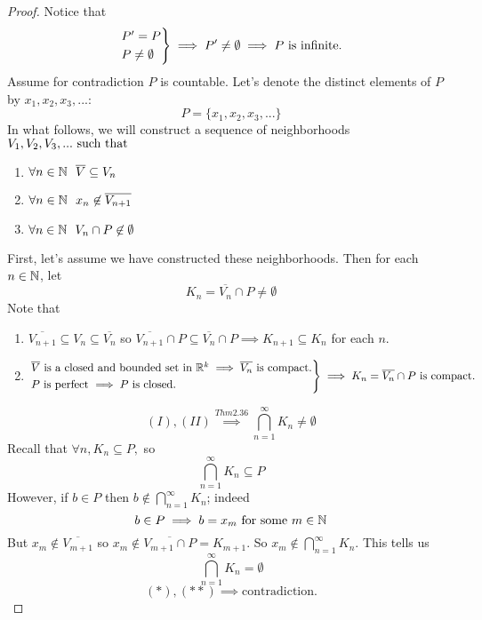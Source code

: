 \begin{proof}
    Notice that
    $$
    \begin{rcases*}
        P' = P \\
        P \not = \emptyset
    \end{rcases*}
    \implies P' \not = \emptyset \implies P \text{ is infinite.}
    $$
    Assume for contradiction $P$ is countable. Let's denote the distinct elements of $P$ by $x_1, x_2, x_3,... :$
    $$P=\{x_1, x_2, x_3,...\}$$
    In what follows, we will construct a sequence of neighborhoods $V_1, V_2, V_3,... \text{ such that }$
    \begin{enumerate}[$(i)$]
        \item $\forall n \in \mathbb{N} ~~\overline{V} \subseteq V_n$
        \item $\forall n \in \mathbb{N} ~~x_n \not \in \overline{V_{n+1}}$
        \item $\forall n \in \mathbb{N} ~~V_n \cap P \not \in \emptyset$
    \end{enumerate}
    First, let's assume we have constructed these neighborhoods.
    Then for each $n\in\mathbb{N}$, let
    $$K_n = \overline{V_n} \cap P \not = \emptyset$$
    Note that
    \begin{enumerate}[$(I)$]
        \item $\overline{V_{n+1}} \subseteq V_n \subseteq \overline{V_n}$ so $\overline{V_{n+1}}\cap P \subseteq \overline{V_n} \cap P \implies K_{n+1} \subseteq K_n$ for each $n.$
        \item $\begin{rcases*}
            \overline{V} \text{ is a closed and bounded set in $\R^k \implies \overline{V_n}$ is compact.} \\
            P \text{ is perfect $\implies P$ is closed.}
        \end{rcases*} \implies K_n = \overline{V_n}\cap P \text{ is compact.}$
    \end{enumerate}
    \begin{equation*}
        (I),(II) \overset{Thm 2.36}{\implies} \bigcap \limits_{n=1}^\infty K_n \not = \emptyset
        \tag{$*$}
    \end{equation*}
    Recall that $\forall n, K_n \subseteq P,$ so
    $$\bigcap \limits_{n=1}^\infty K_n \subseteq P$$
    However, if $b\in P$ then $b \not \in \bigcap \limits_{n=1}^\infty K_n$; indeed
    $$b\in P \implies b=x_m \text{ for some $m\in \mathbb{N}$}$$
    But $x_m \not \in \overline{V_{m+1}}$ so $x_m \not \in \overline{V_{m+1}\cap P} = K_{m+1}.$ So $x_m \not \in \bigcap \limits_{n=1}^\infty K_n.$ This tells us
    \begin{equation*}
        \bigcap \limits_{n=1}^\infty K_n = \emptyset
        \tag{$**$}
    \end{equation*}
    $$(*),(**) \implies \text{contradiction.}$$


\end{proof}
